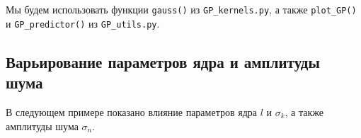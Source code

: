 \documentclass[11pt,a4paper]{article}
\begin{document}
Мы будем использовать функции \texttt{gauss()} из
\texttt{GP\_kernels.py}, а также \texttt{plot\_GP()} и
\texttt{GP\_predictor()} из \texttt{GP\_utils.py}.

    \hypertarget{ux432ux430ux440ux44cux438ux440ux43eux432ux430ux43dux438ux435-ux43fux430ux440ux430ux43cux435ux442ux440ux43eux432-ux44fux434ux440ux430-ux438-ux430ux43cux43fux43bux438ux442ux443ux434ux44b-ux448ux443ux43cux430}{%
\subsection{Варьирование параметров ядра и амплитуды
шума}\label{ux432ux430ux440ux44cux438ux440ux43eux432ux430ux43dux438ux435-ux43fux430ux440ux430ux43cux435ux442ux440ux43eux432-ux44fux434ux440ux430-ux438-ux430ux43cux43fux43bux438ux442ux443ux434ux44b-ux448ux443ux43cux430}}

В следующем примере показано влияние параметров ядра \(l\) и
\(\sigma_k\), а также амплитуды шума \(\sigma_n\).
\end{document}
